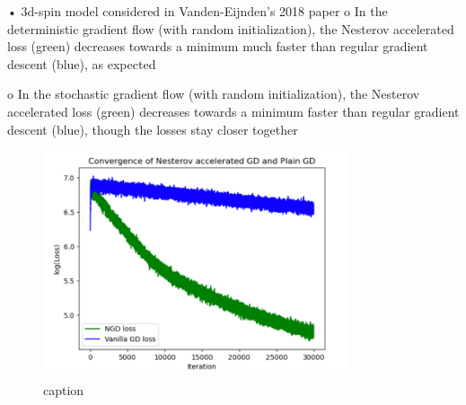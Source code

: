 \documentclass{article}
\begin{document}
 
•	3d-spin model considered in Vanden-Eijnden’s 2018 paper
o	In the deterministic gradient flow (with random initialization), the Nesterov accelerated loss (green) decreases  towards a minimum much faster than regular gradient descent (blue), as expected
 
o	In the stochastic gradient flow (with random initialization), the Nesterov accelerated loss (green) decreases  towards a minimum faster than regular gradient descent (blue), though the losses stay closer together
\begin{figure}[H]
  \centering
  \includegraphics[width=0.8\textwidth]{images/Eijnden2018-SGD-algos-risk-3dspin.png}
  \caption{ caption}
  \label{fig: description}
\end{figure}%
 
\end{document}
